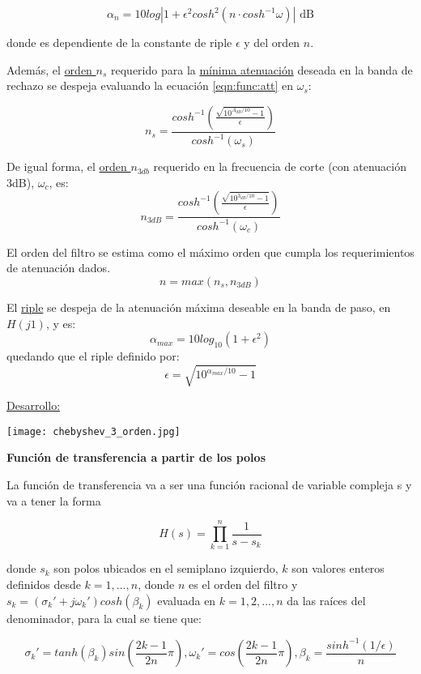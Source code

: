 \documentclass[informe.tex]{subfiles}
\begin{document}
	\begin{equation}
		\label{eqn:func:att}	
		\alpha_n = 10 log \left| 1 + \epsilon^2 cosh^2( n \cdot cosh^{-1} \omega) \right| \mbox{ dB}
	\end{equation}
	
donde es dependiente de la constante de riple $\epsilon$ y del orden $n$.\newline
	
Además, el \underline{orden $n_s$} requerido para la \underline{mínima atenuación} deseada en la banda de rechazo se despeja evaluando la ecuación \ref{eqn:func:att} en $\omega_s$:

			$$ n_s = \frac{ cosh^{-1}  \left(
						   \frac{ \sqrt{ 10^{A_{dB}/10}-1} }{\epsilon} 
						               \right)
						  }{ cosh^{-1}( \omega_s ) } $$

De igual forma, el \underline{orden $n_{3db}$} requerido en la frecuencia de corte (con atenuación 3dB), $\omega_c$, es: 
			$$ n_{3dB} = \frac{ cosh^{-1}  \left(
						   \frac{ \sqrt{ 10^{3_{dB}/10}-1} }{\epsilon} 
						               \right)
						  }{ cosh^{-1}( \omega_c ) } $$	
					  
El orden del filtro se estima como el máximo orden que cumpla los requerimientos de atenuación dados.
			$$n=max(n_s, n_{3dB})$$
	
El \underline{riple} se despeja de la atenuación máxima deseable en la banda de paso, en $H(j1)$, y es:
					$$\alpha_{max}=10 log_{10} ( 1 + \epsilon^2 )$$
quedando que el riple definido por:
	   			$$\epsilon = \sqrt{10^{\alpha_{max}/10} - 1} $$	
   			
\underline{Desarrollo:}\newline
	\begin{center}
	\texttt{[image: chebyshev\_3\_orden.jpg]}
	\end{center}


\textbf{Función de transferencia a partir de los polos }\newline

La función de transferencia va a ser una función racional de variable compleja s y va a tener la forma
	
	$$H(s)= \prod_{k=1}^{n} \frac{1}{s-s_k}$$
	
donde $s_k$	son polos ubicados en el semiplano izquierdo, $k$ son valores enteros definidos desde $k=1, ... , n$, donde $n$ es el orden del filtro y $s_k = (\sigma_k' + j \omega_k')  cosh( \beta_k)$ evaluada en $k=1,2,...,n$ da  las raíces del denominador, para la cual se tiene que:
	\begin{center}
		$$ \sigma_k' = tanh( \beta_k ) sin \left( \frac{2k-1}{2n} \pi \right)  
		, \omega_k' = cos \left( \frac{2k-1}{2n} \pi \right)  
		, \beta_k = \frac { sinh^{-1}(1 / \epsilon )}{n}$$
	\end{center}
\end{document}
